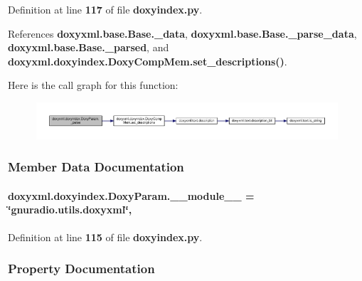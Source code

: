 Definition at line {\bf 117} of file {\bf doxyindex.\+py}.



References {\bf doxyxml.\+base.\+Base.\+\_\+data}, {\bf doxyxml.\+base.\+Base.\+\_\+parse\+\_\+data}, {\bf doxyxml.\+base.\+Base.\+\_\+parsed}, and {\bf doxyxml.\+doxyindex.\+Doxy\+Comp\+Mem.\+set\+\_\+descriptions()}.



Here is the call graph for this function\+:
\nopagebreak
\begin{figure}[H]
\begin{center}
\leavevmode
\includegraphics[width=350pt]{df/d75/classdoxyxml_1_1doxyindex_1_1DoxyParam_ad5a4e5578fdbf3d6cc9b63fe320882a9_cgraph}
\end{center}
\end{figure}




\subsubsection{Member Data Documentation}
\paragraph[{\+\_\+\+\_\+module\+\_\+\+\_\+}]{ doxyxml.\+doxyindex.\+Doxy\+Param.\+\_\+\+\_\+module\+\_\+\+\_\+ = \char`\"{}gnuradio.\+utils.\+doxyxml\char`\"{}\hspace{0.3cm}{\ttfamily [static]}, {\ttfamily [private]}}\label{classdoxyxml_1_1doxyindex_1_1DoxyParam_a790acddee89e1ed339bd79d73c5380bd}


Definition at line {\bf 115} of file {\bf doxyindex.\+py}.



\subsubsection{Property Documentation}
